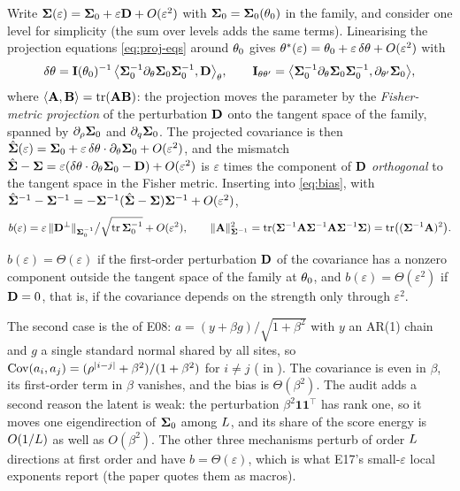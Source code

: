 Write $\mathbf{\Sigma}(\varepsilon)=\mathbf{\Sigma}_0+\varepsilon\mathbf{D}+O(\varepsilon^2)$ with $\mathbf{\Sigma}_0=\mathbf{\Sigma}_0(\theta_0)$
in the family, and consider one level for simplicity (the sum over levels adds the
same terms). Linearising the projection equations \cref{eq:proj-eqs} around
$\theta_0$ gives $\theta^\ast(\varepsilon)=\theta_0+\varepsilon\,\delta\theta+O(\varepsilon^2)$ with
\begin{equation}
  \delta\theta=\mathbf{I}(\theta_0)^{-1}\,\bigl\langle\mathbf{\Sigma}_0^{-1}\partial_\theta\mathbf{\Sigma}_0\mathbf{\Sigma}_0^{-1},\mathbf{D}\bigr\rangle_\theta,
  \qquad
  \mathbf{I}_{\theta\theta'}=\bigl\langle\mathbf{\Sigma}_0^{-1}\partial_\theta\mathbf{\Sigma}_0\mathbf{\Sigma}_0^{-1},\partial_{\theta'}\mathbf{\Sigma}_0\bigr\rangle,
\end{equation}
where $\langle\mathbf{A},\mathbf{B}\rangle=\operatorname{tr}(\mathbf{A}\mathbf{B})$: the projection moves the
parameter by the \emph{Fisher-metric projection} of the perturbation $\mathbf{D}$ onto the
tangent space of the family, spanned by $\partial_\rho\mathbf{\Sigma}_0$ and $\partial_q\mathbf{\Sigma}_0$. The
projected covariance is then
$\hat{\mathbf{\Sigma}}(\varepsilon)=\mathbf{\Sigma}_0+\varepsilon\,\delta\theta\cdot\partial_\theta\mathbf{\Sigma}_0+O(\varepsilon^2)$, and
the mismatch $\hat{\mathbf{\Sigma}}-\mathbf{\Sigma}=\varepsilon(\delta\theta\cdot\partial_\theta\mathbf{\Sigma}_0-\mathbf{D})+O(\varepsilon^2)$
is $\varepsilon$ times the component of $\mathbf{D}$ \emph{orthogonal} to the tangent space in
the Fisher metric. Inserting into \cref{eq:bias}, with
$\hat{\mathbf{\Sigma}}^{-1}-\mathbf{\Sigma}^{-1}=-\mathbf{\Sigma}^{-1}(\hat{\mathbf{\Sigma}}-\mathbf{\Sigma})\mathbf{\Sigma}^{-1}+O(\varepsilon^2)$,
\begin{equation}
  b(\varepsilon)=\varepsilon\,\lVert\mathbf{D}^\perp\rVert_{\mathbf{\Sigma}_0^{-1}}\big/\sqrt{\operatorname{tr}\mathbf{\Sigma}_0^{-1}}+O(\varepsilon^2),
  \qquad \lVert\mathbf{A}\rVert^2_{\mathbf{\Sigma}^{-1}}=\operatorname{tr}(\mathbf{\Sigma}^{-1}\mathbf{A}\mathbf{\Sigma}^{-1}\mathbf{A}\mathbf{\Sigma}^{-1}\mathbf{\Sigma})=\operatorname{tr}\bigl((\mathbf{\Sigma}^{-1}\mathbf{A})^2\bigr).
  \label{eq:bias-first-order}
\end{equation}

\begin{proposition}
\label{prop:bias-order}
$b(\varepsilon)=\Theta(\varepsilon)$ if the first-order perturbation $\mathbf{D}$ of the
covariance has a nonzero component outside the tangent space of the family at
$\theta_0$, and $b(\varepsilon)=\Theta(\varepsilon^2)$ if $\mathbf{D}=0$, that is, if the
covariance depends on the strength only through $\varepsilon^2$.
\end{proposition}

The second case is the  of E08: $a=(y+\beta g)/\sqrt{1+\beta^2}$
with $y$ an AR(1) chain and $g$ a single standard normal shared by all sites, so
$\operatorname{Cov}(a_i,a_j)=(\rho^{|i-j|}+\beta^2)/(1+\beta^2)$ for $i\ne j$ (
in ). The covariance is even in $\beta$, its first-order
term in $\beta$ vanishes, and the bias is $\Theta(\beta^2)$. The audit adds a second
reason the latent is weak: the perturbation $\beta^2\mathbf 1\mathbf 1^\top$ has rank one,
so it moves one eigendirection of $\mathbf{\Sigma}_0$ among $L$, and its share of the score
energy is $O(1/L)$ as well as $O(\beta^2)$. The other three mechanisms perturb
of order $L$ directions at first order and have $b=\Theta(\varepsilon)$, which is
what E17's small-$\varepsilon$ local exponents report (the paper quotes them as macros).

